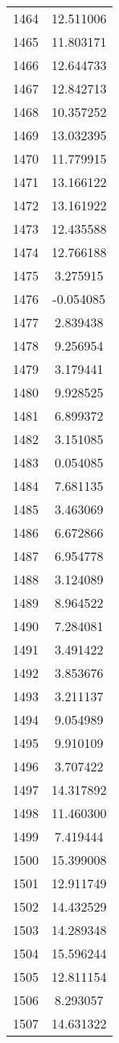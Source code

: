 \documentclass[12pt]{article}
\begin{document}
\begin{longtable}{@{}cc@{}}
1464 & 12.511006 \\
1465 & 11.803171 \\
1466 & 12.644733 \\
1467 & 12.842713 \\
1468 & 10.357252 \\
1469 & 13.032395 \\
1470 & 11.779915 \\
1471 & 13.166122 \\
1472 & 13.161922 \\
1473 & 12.435588 \\
1474 & 12.766188 \\
1475 & 3.275915 \\
1476 & -0.054085 \\
1477 & 2.839438 \\
1478 & 9.256954 \\
1479 & 3.179441 \\
1480 & 9.928525 \\
1481 & 6.899372 \\
1482 & 3.151085 \\
1483 & 0.054085 \\
1484 & 7.681135 \\
1485 & 3.463069 \\
1486 & 6.672866 \\
1487 & 6.954778 \\
1488 & 3.124089 \\
1489 & 8.964522 \\
1490 & 7.284081 \\
1491 & 3.491422 \\
1492 & 3.853676 \\
1493 & 3.211137 \\
1494 & 9.054989 \\
1495 & 9.910109 \\
1496 & 3.707422 \\
1497 & 14.317892 \\
1498 & 11.460300 \\
1499 & 7.419444 \\
1500 & 15.399008 \\
1501 & 12.911749 \\
1502 & 14.432529 \\
1503 & 14.289348 \\
1504 & 15.596244 \\
1505 & 12.811154 \\
1506 & 8.293057 \\
1507 & 14.631322 \\

\end{longtable}
\end{document}
